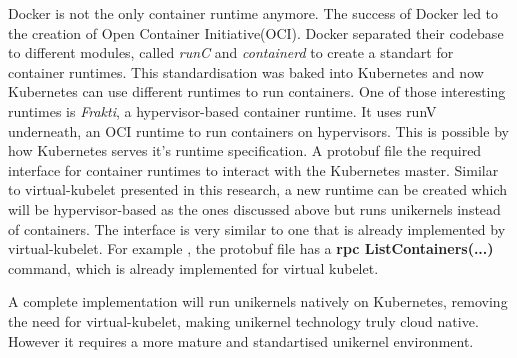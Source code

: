 Docker is not the only container runtime anymore. The success of Docker led to the creation of Open Container Initiative(OCI). Docker separated their codebase to different modules, called \textit{runC} and \textit{containerd} to create a standart for container runtimes. This standardisation was baked into Kubernetes and now Kubernetes can use different runtimes to run containers. One of those interesting runtimes is \textit{Frakti}, a hypervisor-based container runtime. It uses runV underneath, an OCI runtime to run containers on hypervisors. This is possible by how Kubernetes serves it's runtime specification. A protobuf file \cite{protobuf} the required interface for container runtimes to interact with the Kubernetes master. Similar to virtual-kubelet presented in this research, a new runtime can be created which will be hypervisor-based as the ones discussed above but runs unikernels instead of containers. The interface is very similar to one that is already implemented by virtual-kubelet. For example , the protobuf file has a \textbf{rpc ListContainers(...)} command, which is already implemented for virtual kubelet. 

A complete implementation will run unikernels natively on Kubernetes, removing the need for virtual-kubelet, making unikernel technology truly cloud native. However it requires a more mature and standartised unikernel environment.